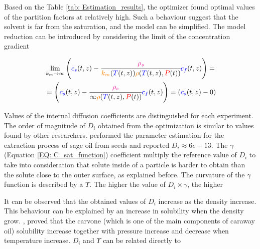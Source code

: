 \documentclass[../Article_Model_Parameters.tex]{subfiles}
\begin{document}
	Based on the Table \ref{tab: Estimation_results}, the optimizer found optimal values of the partition factors at relatively high. Such a behaviour suggest that the solvent is far from the saturation, and the model can be simplified. The model reduction can be introduced by considering the limit of the concentration gradient
	
	{\footnotesize
	\begin{equation*}
		\begin{split}
			&\lim_{k_m \rightarrow \infty} \left({\color{blue}{\color{blue} c_s} }(t,z)  - \cfrac{{\color{magenta}\rho_s}}{{\color{orange}k_m}({\color{blue}T}(t,z)){\color{orange}\rho}({\color{blue}T}(t,z),{\color{red}P}(t))}  {\color{blue}c_f}(t,z) \right)  = \\
			&= \left({\color{blue}{\color{blue} c_s} }(t,z)  - \cfrac{{\color{magenta}\rho_s}}{\infty{\color{orange}\rho}({\color{blue}T}(t,z),{\color{red}P}(t))}  {\color{blue}c_f}(t,z) \right) = \left({\color{blue}{\color{blue} c_s} }(t,z) - 0 \right)
		\end{split}
	\end{equation*} }
		
	Values of the internal diffusion coefficients are distinguished for each experiment. The order of magnitude of $D_i$ obtained from the optimization is similar to values found by other researchers. \citet{Reverchon1996} performed the parameter estimation for the extraction process of sage oil from seeds and reported $D_i \approx 6e-13$. The $\gamma$ (Equation \ref{EQ: C_sat_function}) coefficient multiply the reference value of $D_i$ to take into consideration that solute inside of a particle is harder to obtain than the solute close to the outer surface, as explained before. The curvature of the $\gamma$ function is described by a $\Upsilon$. The higher the value of $D_i \times \gamma$, the higher 
	
	It can be observed that the obtained values of $D_i$ increase as the density increase. This behaviour can be explained by an increase in solubility when the density grow. \citet{Shojaie2010}, proved that the carvone (which is one of the main components of caraway oil) solubility increase together with pressure increase and decrease when temperature increase. $D_i$ and $\Upsilon$ can be related directly to 
	
\end{document}
